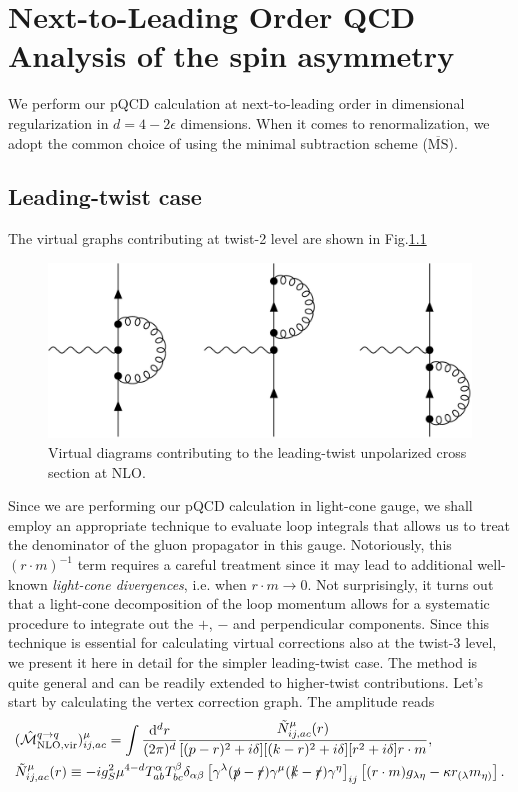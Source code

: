 \chapter{Next-to-Leading Order QCD Analysis of the spin asymmetry}%

We perform our pQCD calculation at next-to-leading order in dimensional regularization in $d=4-2\epsilon$ dimensions. When it comes to renormalization, we adopt the common choice of using the minimal subtraction scheme ($\overline{\text{MS}}$).

\section{Leading-twist case}

The virtual graphs contributing at twist-2 level are shown in Fig.\ref{fig:Virt NLO tw2}
\begin{figure}
    \centering
    \includegraphics[width=0.55\linewidth]{fig/VirtNLOTw2.jpg}
    \caption{Virtual diagrams contributing to the leading-twist unpolarized cross section at NLO.}
    \label{fig:Virt NLO tw2}
\end{figure}
\noindent Since we are performing our pQCD calculation in light-cone gauge, we shall employ an appropriate technique to evaluate loop integrals that allows us to treat the denominator of the gluon propagator in this gauge. Notoriously, this $(r \cdot m)^{-1}$ term requires a careful treatment since it may lead to additional well-known \textit{light-cone divergences}, i.e. when $r \cdot m \to 0$. Not surprisingly, it turns out that a light-cone decomposition of the loop momentum allows for a systematic procedure to integrate out the $+$, $-$ and perpendicular components. Since this technique is essential for calculating virtual corrections also at the twist-3 level, we present it here in detail for the simpler leading-twist case. The method is quite general and can be readily extended to higher-twist contributions. Let's start by calculating the vertex correction graph. The amplitude reads
\begin{equation}\label{eq:amplitudevirtualtwist2}
\begin{aligned}
     &(\hat{\mathcal{M}}^{q \to q}_{\text{NLO,vir}})^\mu_{ij,ac} = \int\frac{\dd ^dr}{(2\pi)^d}\frac{\tilde N^\mu_{ij,ac}(r)}{[(p-r)^2+i\delta][(k-r)^2+i\delta][r^2+i\delta]r \cdot m},\\
       & \tilde N^\mu_{ij,ac}(r) \equiv -ig_S^2\mu^{4-d}T^\alpha_{ab} T^\beta_{bc}\delta_{\alpha\beta}\left[\gamma^\lambda(\slashed{p}-\slashed{r})\gamma^\mu(\slashed{k}-\slashed{r})\gamma^\eta\right]_{ij}\left[(r\cdot m)g_{\lambda\eta}-\kappa r_{(\lambda} m_{\eta)}\right].
    \end{aligned}
\end{equation}
